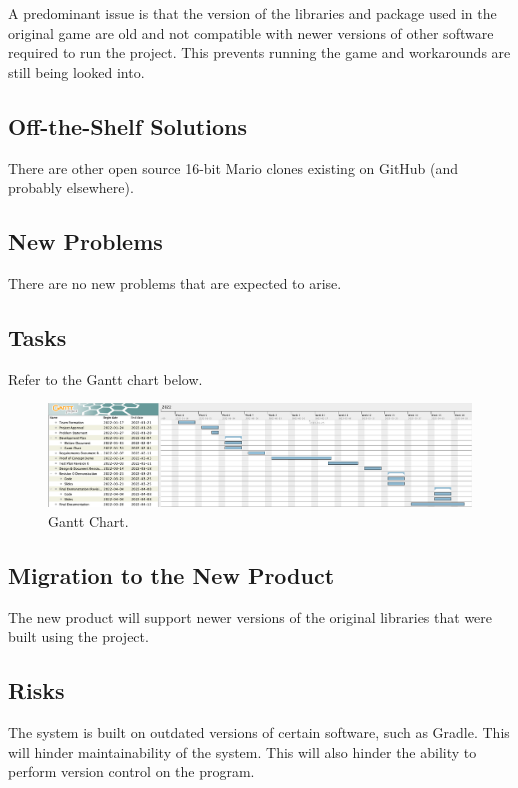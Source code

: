 \documentclass[12pt, titlepage]{article}
\begin{document}
A predominant issue is that the version of the libraries and package used in the original game are old and not compatible with newer versions of other software required to run the project. This prevents running the game and workarounds are still being looked into.


\subsection{Off-the-Shelf Solutions}

There are other open source 16-bit Mario clones existing on GitHub (and probably elsewhere).

\subsection{New Problems}

There are no new problems that are expected to arise.

\subsection{Tasks}
Refer to the Gantt chart below.
\begin{figure}[H]
    \centering
    \includegraphics[scale=0.3]{images/Screen Shot 2022-02-11 at 8.50.38 PM.png}
    \caption{Gantt Chart.}
    \label{fig:my_label}
\end{figure}

\subsection{Migration to the New Product}

The new product will support newer versions of the original libraries that were built using the project.

\subsection{Risks}

The system is built on outdated versions of certain software, such as Gradle. This will hinder maintainability of the system. This will also hinder the ability to perform version control on the program.
\end{document}
